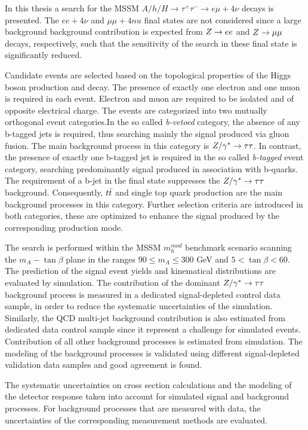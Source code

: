 In this thesis a search for the MSSM 
$A/h/H \rightarrow \tau^+ \tau^- \rightarrow e \mu +4\nu$ decays is presented. The $ee +4\nu$ and $\mu\mu +4nu$ final states 
are not considered since a large background background 
contribution is  expected  from $Z\rightarrow ee$ and $Z\rightarrow \mu\mu$ decays,  respectively, such that the sensitivity of the search in these final
state is significantly reduced.

Candidate events are selected based on the topological properties of the Higgs boson production
and decay. The  presence of exactly one electron and one muon is required in each event. Electron and muon are required to be 
 isolated and of opposite electrical charge.
The  events are categorized into two mutually orthogonal event categories.In the so called  \emph{b-vetoed} category,
the absence of any b-tagged jets is required, thus searching mainly the signal produced via gluon fusion. The main background 
process in  this category is $Z/\gamma^*\rightarrow \tau\tau$. 
In contrast, the presence of exactly one  b-tagged jet is required in the so called \emph{b-tagged} event category, 
searching predominantly signal produced in association with b-quarks. The requirement of a b-jet 
in the final state suppresses the $Z/\gamma^*\rightarrow \tau\tau$ background. Consequently, $t\bar{t}$ and single top quark  production
are the main background processes in this category. Further selection criteria are introduced in both categories, 
these are optimized to enhance the signal produced by the corresponding production mode.

The  search is performed within the MSSM $m_h^{mod}$ benchmark scenario
scanning the $m_A - \tan\beta$ plane in the ranges $90 \leq m_A \leq 300$ GeV and $5 < \tan\beta < 60$.
The prediction of the signal event yields and kinematical distributions are evaluated by simulation.
The contribution of the dominant $Z/\gamma^*\rightarrow \tau\tau$ background process is measured in a dedicated  signal-depleted control data sample,
in order to reduce the systematic uncertainties of the simulation. Similarly, the QCD multi-jet background contribution 
is also estimated from dedicated data control sample since it represent a challenge for simulated events. %
Contribution of  all  other background processes  is estimated from simulation.
The modeling of the background processes is  validated using different signal-depleted validation data samples and
good agreement is found.

The systematic uncertainties  on cross section calculations and the modeling of the detector response
taken into account for simulated signal and background processes. For background processes  that are measured with  data,
the uncertainties of the corresponding measurement methods are evaluated.

